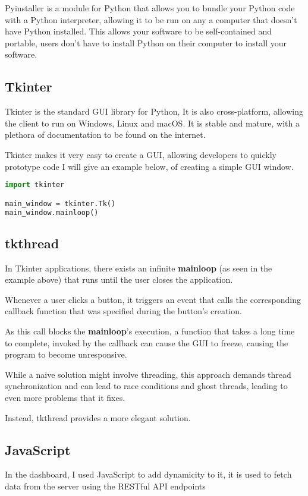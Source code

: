 Pyinstaller is a module for Python that allows you to bundle your
Python code with a Python interpreter, allowing it to be run on any
a computer that doesn't have Python installed.
This allows your software to be self-contained and portable,
users don't have to install Python on their computer to install your software.

\subsection{Tkinter}
Tkinter is the standard GUI library for Python,
It is also cross-platform, allowing the client to run on Windows, Linux and macOS.
It is stable and mature, with a plethora of documentation to be found on the internet.

Tkinter makes it very easy to create a GUI, allowing developers to quickly prototype code
I will give an example below,
of creating a simple GUI window.

\begin{lstlisting}[language=Python]
import tkinter

main_window = tkinter.Tk()
main_window.mainloop()
\end{lstlisting}

\subsection{tkthread}
In Tkinter applications, there exists an infinite \textbf{mainloop}
(as seen in the example above)
that runs until the user closes the application.

Whenever a user clicks a button,
it triggers an event that calls the corresponding callback function
that was specified during the button's creation.

As this call blocks the \textbf{mainloop}'s execution,
a function that takes a long time to complete,
invoked by the callback can cause the GUI to freeze,
causing the program to become unresponsive.

While a naive solution might involve threading,
this approach demands thread synchronization and can lead to race conditions
and ghost threads, leading to even more problems that it fixes.

Instead, tkthread provides a more elegant solution.

\subsection{JavaScript}
In the dashboard, I used JavaScript to add dynamicity to it,
it is used to fetch data from the server using the RESTful API endpoints

